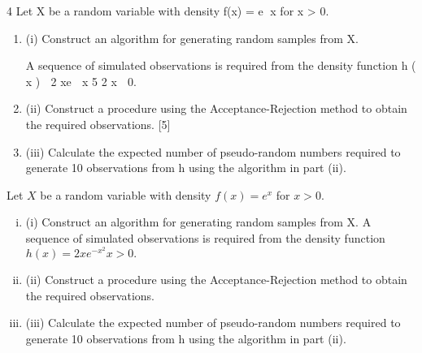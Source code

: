 \documentclass[a4paper,12pt]{article}
\begin{document}
\begin{enumerate}
4
Let X be a random variable with density f(x) = e x for x > 0.
\begin{enumerate}
    \item 
(i)
Construct an algorithm for generating random samples from X.
\\ 
\medskip

A sequence of simulated observations is required from the density function
h ( x )  2 xe  x
5
2
x  0.
\item (ii) Construct a procedure using the Acceptance-Rejection method to obtain the
required observations.
[5]
\item (iii) Calculate the expected number of pseudo-random numbers required to
generate 10 observations from h using the algorithm in part (ii).
\end{enumerate}
\newpage


Let $X$ be a random variable with density $f(x) = e^{x}$ for $x > 0$.



\begin{enumerate}[(i)]
\item 
(i) Construct an algorithm for generating random samples from X. 
A sequence of simulated observations is required from the density function
$h(x) = 2xe^{-x^2} x > 0.$
\item (ii) Construct a procedure using the Acceptance-Rejection method to obtain the required observations. 
\item (iii) Calculate the expected number of pseudo-random numbers required to generate 10 observations from h using the algorithm in part (ii). 
\end{enumerate}


\end{enumerate}
\end{document}
